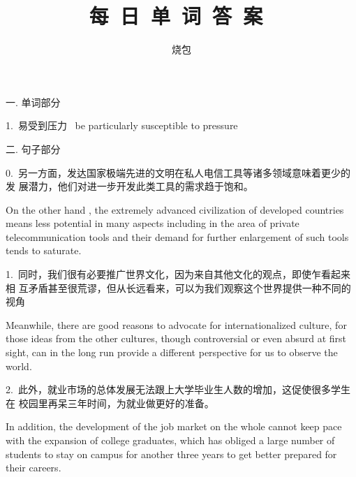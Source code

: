\documentclass[a4paper, 12pt]{article}
\begin{document}
    \noindent

    \title{ 每\ 日\ 单\ 词\ 答\ 案\  }
    \author{ 烧包 }
    \maketitle

\begin{flushleft}
一. 单词部分
\end{flushleft}

\begin{multicols}{2}
\begin{flushleft}
1.\ 易受到压力 \ be particularly susceptible to pressure
\end{flushleft}
\end{multicols}

\begin{flushleft}
二. 句子部分
\end{flushleft}

\begin{flushleft}
0.\ 另一方面，发达国家极端先进的文明在私人电信工具等诸多领域意味着更少的发 展潜力，他们对进一步开发此类工具的需求趋于饱和。

On the other hand , the extremely advanced civilization of developed countries means less potential in many aspects including in the area of private telecommunication tools and their demand for further enlargement of such tools tends to saturate.
\end{flushleft}

\begin{flushleft}
1.\ 同时，我们很有必要推广世界文化，因为来自其他文化的观点，即使乍看起来相 互矛盾甚至很荒谬，但从长远看来，可以为我们观察这个世界提供一种不同的视角

Meanwhile, there are good reasons to advocate for internationalized culture, for those ideas from the other cultures, though controversial or even absurd at first sight, can in the long run provide a different perspective for us to observe the world.
\end{flushleft}

\begin{flushleft}
2.\ 此外，就业市场的总体发展无法跟上大学毕业生人数的增加，这促使很多学生在 校园里再呆三年时间，为就业做更好的准备。

In addition, the development of the job market on the whole cannot keep pace with the expansion of college graduates, which has obliged a large number of students to stay on campus for another three years to get better prepared for their careers.
\end{flushleft}
\end{document}
